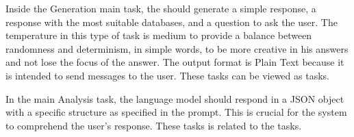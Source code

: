 \begin{table}[H]
  \centering
  \caption{LLM tasks parameters and output information.}
  \label{tasks_info}
\end{table}

Inside the Generation main task, the {\llm} should generate a simple response, a response with the most suitable databases, and a question to ask the user. The temperature in this type of task is medium to provide a balance between randomness and determinism, in simple words, to be more creative in his answers and not lose the focus of the answer. The output format is Plain Text because it is intended to send messages to the user. These tasks can be viewed as {\nlg} tasks.

In the main Analysis task, the language model should respond in a JSON object with a specific structure as specified in the prompt. This is crucial for the system to comprehend the user's response. These tasks is related to the {\nlu} tasks.

